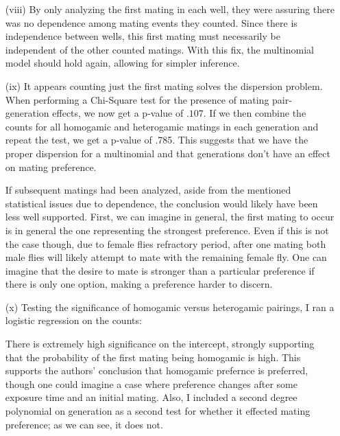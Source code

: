\documentclass[11pt]{article}
\theoremstyle{definition}
\begin{document}
\begin{itemize}
\begin{itemize}
            \item[(viii)] By only analyzing the first mating in each well, they were assuring there was no dependence among mating events they counted. Since there is independence between wells, this first mating must necessarily be independent of the other counted matings. With this fix, the multinomial model should hold again, allowing for simpler inference. 
            \item[(ix)]
                It appears counting just the first mating solves the dispersion problem. When performing a Chi-Square test for the presence of mating pair-generation effects, we now get a p-value of $.107$. If we then combine the counts for all homogamic and heterogamic matings in each generation and repeat the test, we get a p-value of .785. This suggests that we have the proper dispersion for a multinomial and that generations don't have an effect on mating preference. \vspace{2mm}
                
                If subsequent matings had been analyzed, aside from the mentioned statistical issues due to dependence, the conclusion would likely have been less well supported. First, we can imagine in general, the first mating to occur is in general the one representing the strongest preference. Even if this is not the case though, due to female flies refractory period, after one mating both male flies will likely attempt to mate with the remaining female fly. One can imagine that the desire to mate is stronger than a particular preference if there is only one option, making a preference harder to discern.
            \item[(x)]
                Testing the significance of homogamic versus heterogamic pairings, I ran a logistic regression on the counts:
                \FloatBarrier
                
                \FloatBarrier
                There is extremely high significance on the intercept, strongly supporting that the probability of the first mating being homogamic is high. This supports the authors' conclusion that homogamic prefernce is preferred, though one could imagine a case where preference changes after some exposure time and an initial mating. Also, I included a second degree polynomial on generation as a second test for whether it effected mating preference; as we can see, it does not.


\end{itemize}
\end{itemize}
\end{document}
